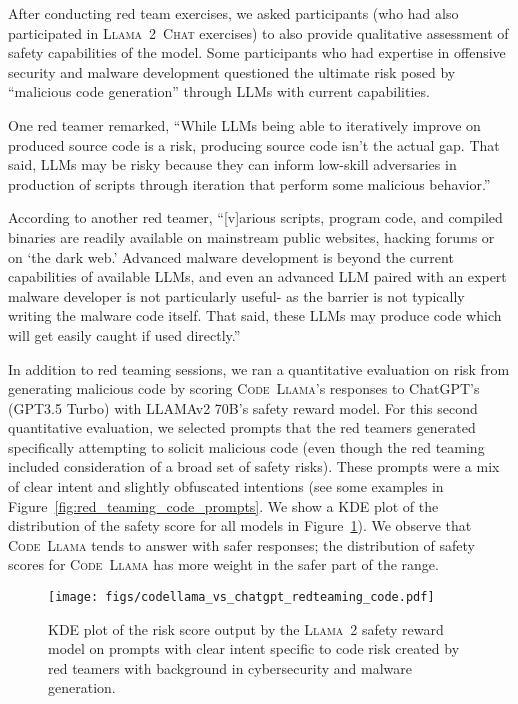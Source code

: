 \documentclass[10pt]{article}
\newcommand{\model}{\textsc{Code~Llama}\xspace}
\newcommand{\llamavtwo}{\textsc{Llama~2}\xspace}
\newcommand{\chatllama}{\textsc{Llama~2~Chat}\xspace}
\begin{document}
After conducting red team exercises, we asked participants (who had also participated in \chatllama exercises) to also provide qualitative assessment of safety capabilities of the model. Some participants who had expertise in offensive security and malware development questioned the ultimate risk posed by ``malicious code generation'' through LLMs with current capabilities. 

One red teamer remarked, ``While LLMs being able to iteratively improve on produced source code is a risk, producing source code isn't the actual gap. That said, LLMs may be risky because they can inform low-skill adversaries in production of scripts through iteration that perform some malicious behavior.''  

According to another red teamer, ``[v]arious scripts, program code, and compiled binaries are readily available on mainstream public websites, hacking forums or on `the dark web.' 
Advanced malware development is beyond the current capabilities of available LLMs, and even an advanced LLM paired with an expert malware developer is not particularly useful- as the barrier is not typically writing the malware code itself. That said, these LLMs may produce code which will get easily caught if used directly.''

In addition to red teaming sessions, we ran a quantitative evaluation on risk from generating malicious code by scoring \model's responses to ChatGPT's (GPT3.5 Turbo) with LLAMAv2 70B's safety reward model. 
For this second quantitative evaluation, we selected prompts that the red teamers generated specifically attempting to solicit malicious code (even though the red teaming included consideration of a broad set of safety risks). 
These prompts were a mix of clear intent and slightly obfuscated intentions (see some examples in Figure~\ref{fig:red_teaming_code_prompts}.
We show a KDE plot of the distribution of the safety score for all models in Figure~\ref{fig:codellama_vs_chatgpt_redteaming_code}).
We observe that \model tends to answer with safer responses; the distribution of safety scores for \model has more weight in the safer part of the range.

\begin{figure}[t]
  \centering
  \texttt{[image: figs/codellama\_vs\_chatgpt\_redteaming\_code.pdf]}
  \caption{KDE plot of the risk score output by the \llamavtwo safety reward model on  prompts with clear intent specific to code risk created by red teamers with background in cybersecurity and malware generation.}
  \label{fig:codellama_vs_chatgpt_redteaming_code}
\end{figure}
\end{document}
